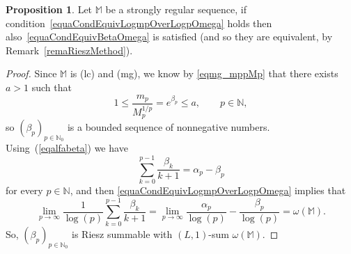 \documentclass[11pt,a4paper]{article}
\theoremstyle{definition}
\newtheorem{pro}[theo]{Proposition}
\newenvironment{prop}{\smallskip\begin{pro}}{\end{pro}\smallskip}
\def\oo{\infty}
\def\ri{\rightarrow}
\def\a{\alpha}
\def\b{\beta}
\def\o{\omega}
\def\N{\mathbb{N}}
\def\M{\mathbb{M}}
\begin{document}
\begin{prop}\label{prop.alpha.implies.beta}
 Let $\M$ be a strongly regular sequence, if condition~\eqref{equaCondEquivLogmpOverLogpOmega} holds then also~\eqref{equaCondEquivBetaOmega} is satisfied (and so they are equivalent, by Remark~\ref{remaRieszMethod}).
\end{prop}

\begin{proof}
Since $\M$ is (lc) and (mg), we know by \eqref{eqmg_mppMp} that there exists $a>1$ such that
\begin{equation}\label{equaCotasBetap}
1\leq \frac{m_p}{M^{1/p}_p}=e^{\b_p}\leq a,\qquad p\in\N,
\end{equation}
so $(\b_p)_{p\in\N_0}$ is a bounded sequence of nonnegative numbers. Using~(\ref{eqalfabeta}) we have
  $$\sum^{p-1}_{k=0}\frac{\b_k}{k+1}=\a_p-\b_p$$
  for every $p\in\N$, and then \eqref{equaCondEquivLogmpOverLogpOmega} implies that
  $$\lim_{p\ri\oo} \frac{1}{\log(p)} \sum^{p-1}_{k=0}\frac{\b_k}{k+1}=\lim_{p\ri\oo} \frac{\a_p}{\log (p)}-\frac{\b_p}{\log (p)} = \o(\M). $$
  So, $(\b_p)_{p\in\N_0}$ is Riesz summable with $(L,1)$-sum $\o(\M)$.


\end{proof}
\end{document}
